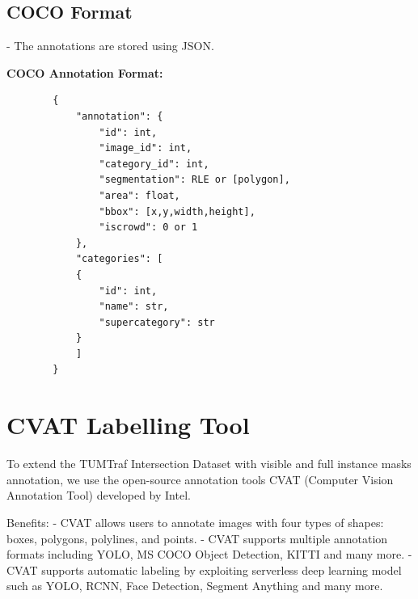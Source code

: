 \subsection{COCO Format}
-  The annotations are stored using JSON.

\begin{mdframed}
	\textbf{COCO Annotation Format:}
	\begin{verbatim}
		{
			"annotation": {
				"id": int,
				"image_id": int,
				"category_id": int,
				"segmentation": RLE or [polygon],
				"area": float,
				"bbox": [x,y,width,height],
				"iscrowd": 0 or 1
			},
			"categories": [
			{
				"id": int,
				"name": str,
				"supercategory": str
			}
			]
		}
	\end{verbatim}
\end{mdframed}


\section{CVAT Labelling Tool}

To extend the TUMTraf Intersection Dataset with visible and full instance masks annotation, we use the open-source annotation tools CVAT (Computer Vision Annotation Tool) \cite{cvat} developed by Intel. 

Benefits: 
- CVAT allows users to annotate images with four types of shapes: boxes, polygons, polylines, and points. 
- CVAT supports multiple annotation formats including YOLO, MS COCO Object Detection, KITTI and many more. 
- CVAT supports automatic labeling by exploiting serverless deep learning model such as YOLO, RCNN, Face Detection, Segment Anything and many more. 

